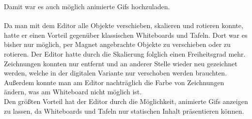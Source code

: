 Damit war es auch möglich animierte Gifs hochzuladen.
\\
\\
Da man mit dem Editor alle Objekte verschieben, skalieren und rotieren konnte, hatte er einen Vorteil gegenüber klassischen Whiteboards und Tafeln.
Dort war es bisher nur möglich, per Magnet angebrachte Objekte zu verschieben oder zu rotieren.
Der Editor hatte durch die Skalierung folglich einen Freiheitsgrad mehr.
Zeichnungen konnten nur entfernt und an anderer Stelle wieder neu gezeichnet werden, welche in der digitalen Variante nur verschoben werden brauchten. Außerdem konnte man am Editor nachträglich die Farbe von Zeichnungen ändern, was am Whiteboard nicht möglich ist.
\\
Den größten Vorteil hat der Editor durch die Möglichkeit, animierte Gifs anzeigen zu lassen, da Whiteboards und Tafeln nur statischen Inhalt präsentieren können.



